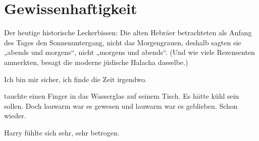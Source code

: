 \chapter{Gewissenhaftigkeit}

\begin{chapterOpeningAuthorNote}
%
Der heutige historische Leckerbissen: Die alten Hebräer betrachteten als Anfang des Tages den Sonnenuntergang, nicht das Morgengrauen, deshalb sagten sie „abends und morgens“, nicht „morgens und abends“. (Und wie viele Rezensenten anmerkten, besagt die moderne jüdische Halacha dasselbe.)
\end{chapterOpeningAuthorNote}
\begin{chapterOpeningQuote}
Ich bin mir sicher, ich finde die Zeit irgendwo.
\end{chapterOpeningQuote}

{}

 tauchte einen Finger in das Wasserglas auf seinem Tisch. Es hätte kühl sein sollen. Doch lauwarm war es gewesen und lauwarm war es geblieben. Schon wieder.

Harry fühlte sich sehr, sehr betrogen.

